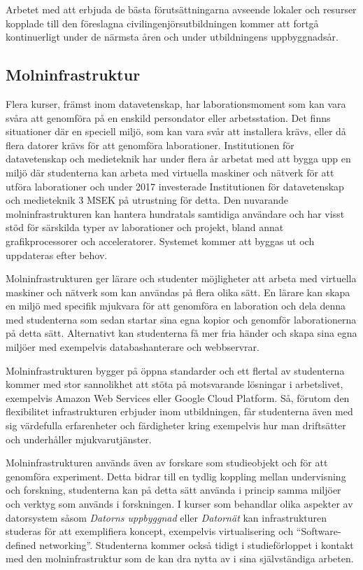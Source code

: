 Arbetet med att erbjuda de bästa förutsättningarna avseende lokaler och resurser kopplade till den föreslagna civilingenjörsutbildningen kommer att fortgå kontinuerligt under de närmsta åren och under utbildningens uppbyggnadsår.

\subsection{Molninfrastruktur}

Flera kurser, främst inom datavetenskap, har laborationsmoment som kan vara svåra att genomföra på en enskild persondator eller arbetsstation. Det finns situationer där en speciell miljö, som kan vara svår att installera krävs, eller då flera datorer krävs för att genomföra laborationer. Institutionen för datavetenskap och medieteknik har under flera år arbetat med att bygga upp en miljö där studenterna kan arbeta med virtuella maskiner och nätverk för att utföra laborationer och under 2017 investerade Institutionen för datavetenskap och medieteknik 3 MSEK på utrustning för detta. Den nuvarande molninfrastrukturen kan hantera hundratals samtidiga användare och har visst stöd för särskilda typer av laborationer och projekt, bland annat grafikprocessorer och acceleratorer. Systemet kommer att byggas ut och uppdateras efter behov.

Molninfrastrukturen ger lärare och studenter möjligheter att arbeta med virtuella maskiner och nätverk som kan användas på flera olika sätt. En lärare kan skapa en miljö med specifik mjukvara för att genomföra en laboration och dela denna med studenterna som sedan startar sina egna kopior och genomför laborationerna på detta sätt. Alternativt kan studenterna få mer fria händer och skapa sina egna miljöer med exempelvis databashanterare och webbservrar.

Molninfrastrukturen bygger på öppna standarder och ett flertal av studenterna kommer med stor sannolikhet att stöta på motsvarande lösningar i arbetslivet, exempelvis Amazon Web Services eller Google Cloud Platform. Så, förutom den flexibilitet infrastrukturen erbjuder inom utbildningen, får studenterna även med sig värdefulla erfarenheter och färdigheter kring exempelvis hur man driftsätter och underhåller mjukvarutjänster.

Molninfrastrukturen används även av forskare som studieobjekt och för att genomföra experiment. Detta bidrar till en tydlig koppling mellan undervisning och forskning, studenterna kan på detta sätt använda i princip samma miljöer och verktyg som används i forskningen. I kurser som behandlar olika aspekter av datorsystem såsom \emph{Datorns uppbyggnad} eller \emph{Datornät} kan infrastrukturen studeras för att exemplifiera koncept, exempelvis virtualisering och ``Software-defined networking''. Studenterna kommer också tidigt i studieförloppet i kontakt med den molninfrastruktur som de kan dra nytta av i sina självständiga arbeten.

